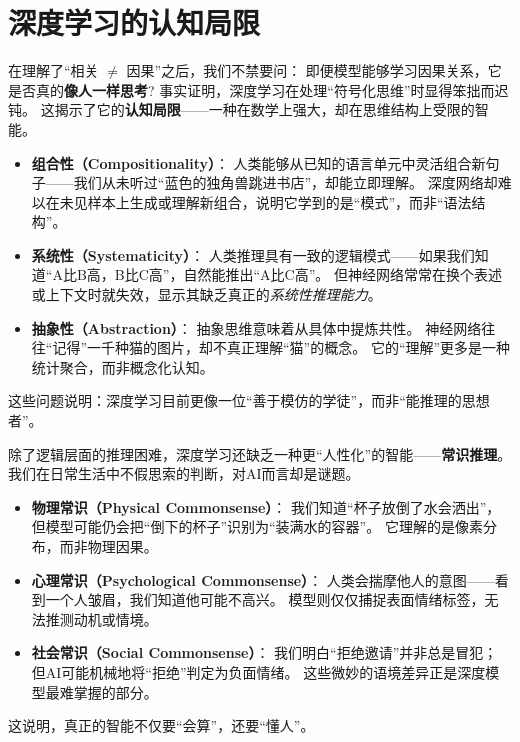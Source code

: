 \section{深度学习的认知局限}

在理解了“相关 $\ne$ 因果”之后，我们不禁要问：  
即便模型能够学习因果关系，它是否真的\textbf{像人一样思考}?  
事实证明，深度学习在处理“符号化思维”时显得笨拙而迟钝。  
这揭示了它的\textbf{认知局限}——一种在数学上强大，却在思维结构上受限的智能。

\begin{itemize}
\item \textbf{组合性（Compositionality）}：  
  人类能够从已知的语言单元中灵活组合新句子——我们从未听过“蓝色的独角兽跳进书店”，却能立即理解。  
  深度网络却难以在未见样本上生成或理解新组合，说明它学到的是“模式”，而非“语法结构”。  

\item \textbf{系统性（Systematicity）}：  
  人类推理具有一致的逻辑模式——如果我们知道“A比B高，B比C高”，自然能推出“A比C高”。  
  但神经网络常常在换个表述或上下文时就失效，显示其缺乏真正的\textit{系统性推理能力}。  

\item \textbf{抽象性（Abstraction）}：  
  抽象思维意味着从具体中提炼共性。  
  神经网络往往“记得”一千种猫的图片，却不真正理解“猫”的概念。  
  它的“理解”更多是一种统计聚合，而非概念化认知。  
\end{itemize}
这些问题说明：深度学习目前更像一位“善于模仿的学徒”，而非“能推理的思想者”。

除了逻辑层面的推理困难，深度学习还缺乏一种更“人性化”的智能——\textbf{常识推理}。  
我们在日常生活中不假思索的判断，对AI而言却是谜题。  

\begin{itemize}
\item \textbf{物理常识（Physical Commonsense）}：  
  我们知道“杯子放倒了水会洒出”，但模型可能仍会把“倒下的杯子”识别为“装满水的容器”。  
  它理解的是像素分布，而非物理因果。  

\item \textbf{心理常识（Psychological Commonsense）}：  
  人类会揣摩他人的意图——看到一个人皱眉，我们知道他可能不高兴。  
  模型则仅仅捕捉表面情绪标签，无法推测动机或情境。  

\item \textbf{社会常识（Social Commonsense）}：  
  我们明白“拒绝邀请”并非总是冒犯；  
  但AI可能机械地将“拒绝”判定为负面情绪。  
  这些微妙的语境差异正是深度模型最难掌握的部分。  
\end{itemize}
这说明，真正的智能不仅要“会算”，还要“懂人”。

